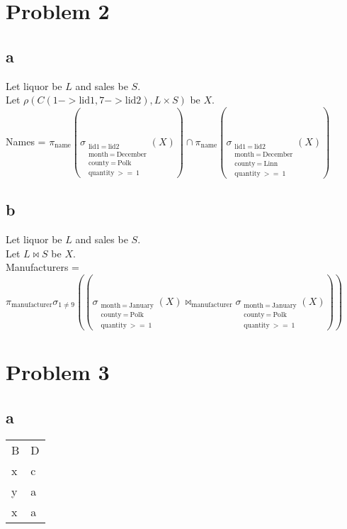 \documentclass[twoside]{Homework}
\begin{document}
\maketitle

\section*{Problem 2}
\subsection*{a}
Let liquor be $L$ and sales be $S$.\\
\noindent 
Let $\rho(C(1->\textrm{lid1}, 7->\textrm{lid2}), L \times S)$ be $X$.\\
\noindent
Names = $\pi_{\textrm{name}}(\sigma_{\substack{\textrm{lid1}\ =\ \textrm{lid2}\\ \textrm{month}\ =\ \textrm{December}\\ \textrm{county}\ =\ \textrm{Polk}\\\textrm{quantity}\ >=\ 1}}(X))
\cap 
\pi_{\textrm{name}}(\sigma_{\substack{\textrm{lid1}\ =\ \textrm{lid2}\\ \textrm{month}\ =\ \textrm{December}\\ \textrm{county}\ =\ \textrm{Linn}\\\textrm{quantity}\ >=\ 1}}(X))$

\subsection*{b}
Let liquor be $L$ and sales be $S$.\\
\noindent 
Let $L \bowtie S$ be $X$.\\
\noindent
Manufacturers = $\pi_{\textrm{manufacturer}}
\sigma_{1 \neq 9}((\sigma_{\substack{\textrm{month}\ =\ \textrm{January}\\ \textrm{county}\ =\ \textrm{Polk}\\\textrm{quantity}\ >=\ 1}}(X)
\bowtie_{\textrm{manufacturer}}
\sigma_{\substack{\textrm{month}\ =\ \textrm{January}\\ \textrm{county}\ =\ \textrm{Polk}\\\textrm{quantity}\ >=\ 1}}(X)))$

\section*{Problem 3}
\subsection*{a}
\begin{table}[h]
\begin{tabular}{ll}
B & D \\
x & c \\
y & a \\
x & a
\end{tabular}
\end{table}
\newpage
\end{document}
